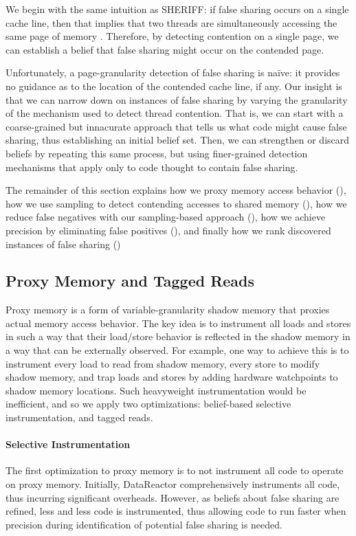 \documentclass{sig-alternate}
\newcommand{\Toolname}{DataReactor}
\begin{document}
We begin with the same intuition as SHERIFF: if false sharing occurs on a single cache line, then that implies that two
threads are simultaneously accessing the same page of memory \cite{SHERIFF}. Therefore, by detecting contention on
a single page, we can establish a belief that false sharing might occur on the contended page.

Unfortunately, a page-granularity detection of false sharing is na{\"i}ve: it provides no guidance as to the location of the
contended cache line, if any. Our insight is that we can narrow down on instances of false sharing by varying the
granularity of the mechanism used to detect thread contention. That is, we can start with a coarse-grained but
innacurate approach that tells us what code might cause false sharing, thus establishing an initial belief set. Then, we
can strengthen or discard beliefs by repeating this same process, but using finer-grained detection mechanisms that
apply only to code thought to contain false sharing.

The remainder of this section explains how we proxy memory access behavior (), how we use sampling
to detect contending accesses to shared memory (), how we reduce false negatives with our
sampling-based approach (), how we achieve precision by eliminating false positives (),
and finally how we rank discovered instances of false sharing ()

\subsection{Proxy Memory and Tagged Reads}\label{sec:proxymem}
Proxy memory is a form of variable-granularity shadow memory that proxies actual memory access behavior. The key
idea is to instrument all loads and stores in such a way that their load/store behavior is reflected in the shadow
memory in a way that can be externally observed. For example, one way to achieve this is to instrument every load
to read from shadow memory, every store to modify shadow memory, and trap loads and stores by adding hardware
watchpoints to shadow memory locations. Such heavyweight instrumentation would be inefficient, and so we apply
two optimizations: belief-based selective instrumentation, and tagged reads.

\paragraph{Selective Instrumentation}
The first optimization to proxy memory is to not instrument all code to operate on proxy memory. Initially, \Toolname{}
comprehensively instruments all code, thus incurring significant overheads. However, as beliefs about false sharing
are refined, less and less code is instrumented, thus allowing code to run faster when precision during identification of
potential false sharing is needed.
\end{document}
